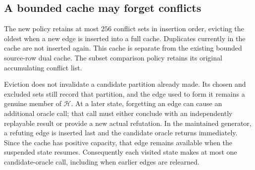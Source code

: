\subsection{A bounded cache may forget conflicts}

The new policy retains at most $256$ conflict sets in insertion order,
evicting the oldest when a new edge is inserted into a full cache.
Duplicates currently in the cache are not inserted again.  This cache
is separate from the existing bounded source-row dual cache.  The subset
comparison policy retains its original accumulating conflict list.

Eviction does not invalidate a candidate partition already made.  Its
chosen and excluded sets still record that partition, and the edge used
to form it remains a genuine member of $\mathcal H$.  At a later state,
forgetting an edge can cause an additional oracle call; that call must
either conclude with an independently replayable result or provide a
new actual refutation.  In the maintained generator, a refuting edge is
inserted last and the candidate oracle returns immediately.  Since the
cache has positive capacity, that edge remains available when the
suspended state resumes.  Consequently each visited state makes at most
one candidate-oracle call, including when earlier edges are relearned.

